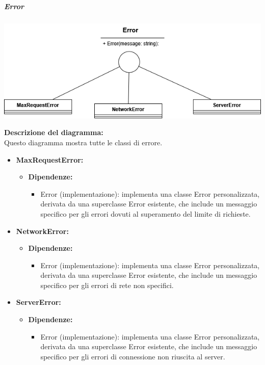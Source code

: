 \subparagraph{Error}
\begin{center}
    \includegraphics[scale=0.45]{template/images/uml_front/logic/error.png}
\end{center}
\textbf{Descrizione del diagramma:}\\
Questo diagramma mostra tutte le classi di errore.
\begin{itemize}
    \item \textbf{MaxRequestError:}
          \begin{itemize}
              \item \textbf{Dipendenze:}
                    \begin{itemize}
                        \item Error (implementazione): implementa una classe Error personalizzata, derivata
                              da una superclasse Error esistente, che include un messaggio specifico per gli
                              errori dovuti al superamento del limite di richieste.
                    \end{itemize}
          \end{itemize}

    \item \textbf{NetworkError:}
          \begin{itemize}
              \item \textbf{Dipendenze:}
                    \begin{itemize}
                        \item Error (implementazione): implementa una classe Error personalizzata, derivata
                              da una superclasse Error esistente, che include un messaggio specifico per gli
                              errori di rete non specifici.
                    \end{itemize}
          \end{itemize}

    \item \textbf{ServerError:}
          \begin{itemize}
              \item \textbf{Dipendenze:}
                    \begin{itemize}
                        \item Error (implementazione): implementa una classe Error personalizzata, derivata
                              da una superclasse Error esistente, che include un messaggio specifico per gli
                              errori di connessione non riuscita al server.
                    \end{itemize}
          \end{itemize}
\end{itemize}

